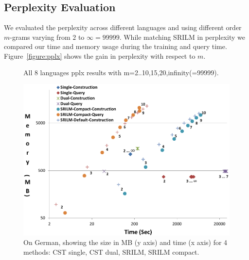 \subsection{Perplexity Evaluation}
We evaluated the perplexity across different languages and using different order $m$-grams varying from $2$ to $\infty=99999$. While matching SRILM in perplexity we compared our time and memory usage during the training and query time. Figure~\ref{figure:pplx} shows the gain in perplexity with respect to $m$. 
\begin{figure}

\caption{All 8 languages pplx results with m=2..10,15,20,infinity(=99999).}
\end{figure}\label{figure:pplx}

\begin{figure}
\includegraphics[width=\columnwidth]{figures/Time-Space.pdf}
\caption{On German, showing the size in MB (y axis) and time (x axis) for 4 methods: CST single, CST dual, SRILM, SRILM compact.}
\end{figure}









